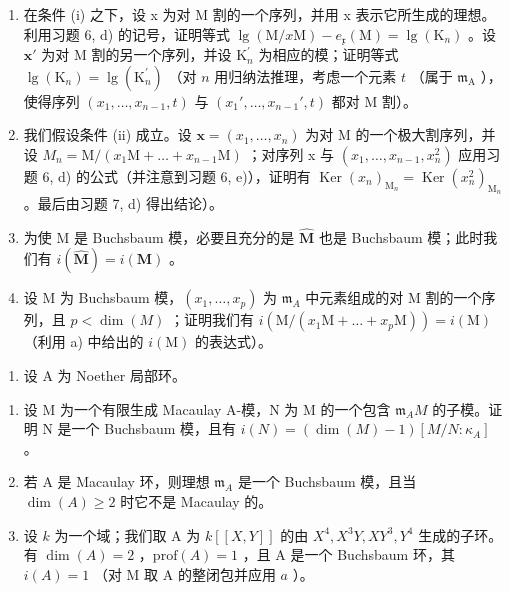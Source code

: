 \begin{enumerate}
\def\labelenumi{\alph{enumi})}
\item
  在条件 (i) 之下，设 x 为对 M 割的一个序列，并用 x 表示它所生成的理想。利用习题 6, d) 的记号，证明等式 \(\lg(\mathrm{M}/x\mathrm{M}) - e_{\mathfrak{x}}(\mathrm{M}) = \lg(\mathrm{K}_{n})\) 。设 \(\mathbf{x}'\) 为对 M 割的另一个序列，并设 \(\mathrm{K}_{n}^{\prime}\) 为相应的模；证明等式 \(\lg(\mathrm{K}_{n}) = \lg(\mathrm{K}_{n}^{\prime})\) （对 \(n\) 用归纳法推理，考虑一个元素 \(t\) （属于 \(\mathfrak{m}_{\mathrm{A}}\) ），使得序列 \((x_{1},\ldots,x_{n-1},t)\) 与 \((x_{1}',\ldots,x_{n-1}',t)\) 都对 M 割）。
\item
  我们假设条件 (ii) 成立。设 \(\mathbf{x} = (x_{1}, \ldots, x_{n})\) 为对 M 的一个极大割序列，并设 \(M_{n} = \mathrm{M}/(x_{1}\mathrm{M} + \ldots + x_{n-1}\mathrm{M})\) ；对序列 x 与 \((x_{1}, \ldots, x_{n-1}, x_{n}^{2})\) 应用习题 6, d) 的公式（并注意到习题 6, e)），证明有 \(\operatorname{Ker}(x_{n})_{\mathrm{M}_{n}} = \operatorname{Ker}(x_{n}^{2})_{\mathrm{M}_{n}}\) 。最后由习题 7, d) 得出结论）。
\item
  为使 M 是 Buchsbaum 模，必要且充分的是 \(\widehat{\mathbf{M}}\) 也是 Buchsbaum 模；此时我们有 \(i(\widehat{\mathbf{M}}) = i(\mathbf{M})\) 。
\item
  设 M 为 Buchsbaum 模，\((x_{1},\ldots,x_{p})\) 为 \(\mathfrak{m}_{A}\) 中元素组成的对 M 割的一个序列，且 \(p<\dim(M)\) ；证明我们有 \(i(\mathrm{M}/(x_{1}\mathrm{M}+\ldots+x_{p}\mathrm{M}))=i(\mathrm{M})\) （利用 a) 中给出的 \(i(\mathrm{M})\) 的表达式）。
\end{enumerate}

\begin{enumerate}
\def\labelenumi{\arabic{enumi})}
\setcounter{enumi}{8}
\tightlist
\item
  设 A 为 Noether 局部环。
\end{enumerate}

\begin{enumerate}
\def\labelenumi{\alph{enumi})}
\item
  设 M 为一个有限生成 Macaulay A-模，N 为 M 的一个包含 \(\mathfrak{m}_{A}M\) 的子模。证明 N 是一个 Buchsbaum 模，且有 \(i(N) = (\dim(M) - 1)[M/N : \kappa_{A}]\) 。
\item
  若 A 是 Macaulay 环，则理想 \(\mathfrak{m}_{A}\) 是一个 Buchsbaum 模，且当 \(\dim(A) \geqslant 2\) 时它不是 Macaulay 的。
\item
  设 \(k\) 为一个域；我们取 A 为 \(k[[X,Y]]\) 的由 \(X^4, X^3Y, XY^3, Y^4\) 生成的子环。有 \(\dim(A) = 2\) ，\(\text{prof}(A) = 1\) ，且 A 是一个 Buchsbaum 环，其 \(i(A) = 1\) （对 M 取 A 的整闭包并应用 \(a\) ）。
\end{enumerate}

